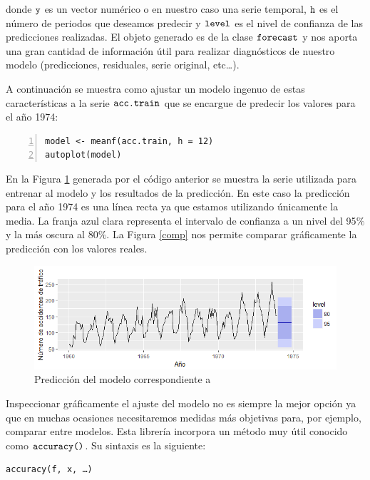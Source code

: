 \noindent donde $\verb!y!$ es un vector numérico o en nuestro caso una serie temporal, $\verb!h!$ es el número de periodos que deseamos predecir y $\verb!level!$ es el nivel de confianza de las predicciones realizadas. El objeto generado es de la clase $\verb!forecast!$ y nos aporta una gran cantidad de información útil para realizar diagnósticos de nuestro modelo (predicciones, residuales, serie original, etc…).

A continuación se muestra como ajustar un modelo ingenuo de estas características a la serie $\verb!acc.train!$ que se encargue de predecir los valores para el año 1974:

\begin{Verbatim}[fontsize=\footnotesize, numbers = left]
model <- meanf(acc.train, h = 12)
autoplot(model)
\end{Verbatim}

En la Figura \ref{meanf_1} generada por el código anterior se muestra la serie utilizada para entrenar al modelo y los resultados de la predicción. En este caso la predicción para el año 1974 es una línea recta ya que estamos utilizando únicamente la media. La franja azul clara representa el intervalo de confianza a un nivel del 95$\%$ y la más oscura al 80$\%$. La Figura \ref{comp} nos permite comparar gráficamente la predicción con los valores reales.
\begin{figure}
    \centering
    \centerline{\includegraphics[scale = 0.7]{Images/Modelizacion/35.png}}
    \caption{Predicción del modelo correspondiente a }
    \label{meanf_1}
\end{figure}

Inspeccionar gráficamente el ajuste del modelo no es siempre la mejor opción ya que en muchas ocasiones necesitaremos medidas más objetivas para, por ejemplo, comparar entre modelos. Esta librería incorpora un método muy útil conocido como $\verb!accuracy()!$. Su sintaxis es la siguiente:
\begin{Verbatim}[fontsize=\footnotesize]
accuracy(f, x, …)
\end{Verbatim}

